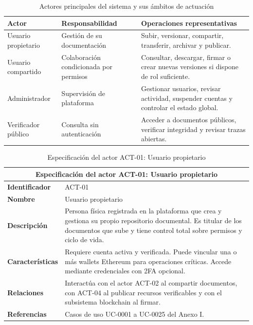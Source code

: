 \documentclass[11pt, a4paper]{article}
\begin{document}
\begin{table}[H]
    \centering
    \small
    \begin{tabular}{|p{3.1cm}|p{4cm}|p{5.9cm}|}
    \hline
    \textbf{Actor} & \textbf{Responsabilidad} & \textbf{Operaciones representativas} \\
    \hline
    Usuario propietario & Gestión de su documentación & Subir, versionar, compartir, transferir, archivar y publicar. \\
    \hline
    Usuario compartido & Colaboración condicionada por permisos & Consultar, descargar, firmar o crear nuevas versiones si dispone de rol suficiente. \\
    \hline
    Administrador & Supervisión de plataforma & Gestionar usuarios, revisar actividad, suspender cuentas y controlar el estado global. \\
    \hline
    Verificador público & Consulta sin autenticación & Acceder a documentos públicos, verificar integridad y revisar trazas abiertas. \\
    \hline
    \end{tabular}
    \caption{Actores principales del sistema y sus ámbitos de actuación}
    \label{tab:actores-principales}
\end{table}

\begin{table}[H]
    \centering
    \small
    \begin{tabular}{|p{4cm}|p{9cm}|}
    \hline
    \multicolumn{2}{|c|}{\textbf{Especificación del actor ACT-01: Usuario propietario}} \\
    \hline
    \textbf{Identificador} & ACT-01 \\
    \hline
    \textbf{Nombre} & Usuario propietario \\
    \hline
    \textbf{Descripción} & Persona física registrada en la plataforma que crea y gestiona su propio repositorio documental. Es titular de los documentos que sube y tiene control total sobre permisos y ciclo de vida. \\
    \hline
    \textbf{Características} & Requiere cuenta activa y verificada. Puede vincular una o más wallets Ethereum para operaciones críticas. Accede mediante credenciales con 2FA opcional. \\
    \hline
    \textbf{Relaciones} & Interactúa con el actor ACT-02 al compartir documentos, con ACT-04 al publicar recursos verificables y con el subsistema blockchain al firmar. \\
    \hline
    \textbf{Referencias} & Casos de uso UC-0001 a UC-0025 del Anexo I. \\
    \hline
    \end{tabular}
    \caption{Especificación del actor ACT-01: Usuario propietario}
    \label{tab:actor-act01}
\end{table}
\end{document}
